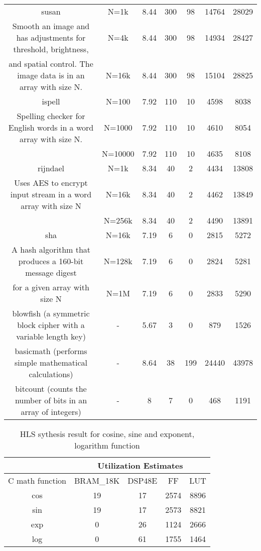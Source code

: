 \documentclass[conference]{IEEEtran}
\begin{document}
\begin{table*}[!t]
\begin{tabular}{|c|c|c|c|c|c|c|}
\hline
susan & N=1k & 8.44 & 300 & 98 & 14764 & 28029\tabularnewline
\cline{2-7}
Smooth an image and has adjustments for threshold, brightness,  & N=4k & 8.44 & 300 & 98 & 14934 & 28427\tabularnewline
\cline{2-7}
and spatial control. The image data is in an array with size N. & N=16k & 8.44 & 300 & 98 & 15104 & 28825\tabularnewline
\hline
ispell & N=100 & 7.92 & 110 & 10 & 4598 & 8038\tabularnewline
\cline{2-7}
Spelling checker for English words in a word array with size N. & N=1000 & 7.92 & 110 & 10 & 4610 & 8054\tabularnewline
\cline{2-7}
 & N=10000 & 7.92 & 110 & 10 & 4635 & 8108\tabularnewline
\hline
rijndael & N=1k & 8.34 & 40 & 2 & 4434 & 13808\tabularnewline
\cline{2-7}
Uses AES to encrypt input stream in a word array with size N  & N=16k & 8.34 & 40 & 2 & 4462 & 13849\tabularnewline
\cline{2-7}
 & N=256k & 8.34 & 40 & 2 & 4490 & 13891\tabularnewline
\hline
sha & N=16k & 7.19 & 6 & 0 & 2815 & 5272\tabularnewline
\cline{2-7}
A hash algorithm that produces a 160-bit message digest & N=128k & 7.19 & 6 & 0 & 2824 & 5281\tabularnewline
\cline{2-7}
for a given array with size N & N=1M & 7.19 & 6 & 0 & 2833 & 5290\tabularnewline
\hline
blowfish (a symmetric block cipher with a variable length key) & - & 5.67 & 3 & 0 & 879 & 1526\tabularnewline
\hline
basicmath (performs simple mathematical calculations) & - & 8.64 & 38 & 199 & 24440 & 43978\tabularnewline
\hline
bitcount (counts the number of bits in an array of integers) & - & 8 & 7 & 0 & 468 & 1191\tabularnewline
\hline
\end{tabular}


\end{table*}





%
\begin{table}
\caption{HLS sythesis result for cosine, sine and exponent, logarithm function}\label{table_cos_sine}


\begin{tabular}{|c|c|c|c|c|}
\hline
 & \multicolumn{4}{c|}{Utilization Estimates}\tabularnewline
\hline
C math function & BRAM\_18K  & DSP48E  & FF & LUT\tabularnewline
\hline
\hline
cos & 19 & 17 & 2574 & 8896\tabularnewline
\hline
sin & 19 & 17 & 2573 & 8821\tabularnewline
\hline
exp & 0 & 26 & 1124 & 2666\tabularnewline
\hline
log & 0 & 61 & 1755 & 1464\tabularnewline
\hline
\end{tabular}
\end{table}
\end{document}
